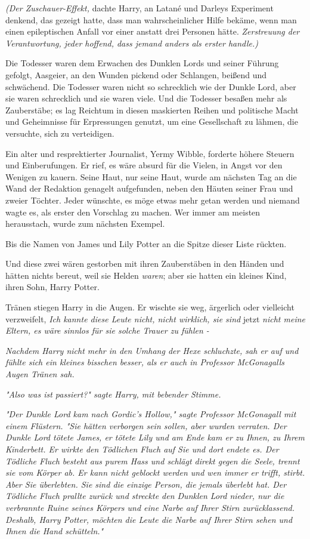 {\emph{(Der Zuschauer-Effekt,} dachte Harry, an Latané und Darleys Experiment denkend, das gezeigt hatte, dass man wahrscheinlicher Hilfe bekäme, wenn man einen epileptischen Anfall vor einer anstatt drei Personen hätte. \emph{Zerstreuung der Verantwortung, jeder hoffend, dass jemand anders als erster handle.)}

Die Todesser waren dem Erwachen des Dunklen Lords und seiner Führung gefolgt, Aasgeier, an den Wunden pickend oder Schlangen, beißend und schwächend. Die Todesser waren nicht so schrecklich wie der Dunkle Lord, aber sie waren schrecklich und sie waren viele. Und die Todesser besaßen mehr als Zauberstäbe; es lag Reichtum in diesen maskierten Reihen und politische Macht und Geheimnisse für Erpressungen genutzt, um eine Gesellschaft zu lähmen, die versuchte, sich zu verteidigen.

Ein alter und resprektierter Journalist, Yermy Wibble, forderte höhere Steuern und Einberufungen. Er rief, es wäre absurd für die Vielen, in Angst vor den Wenigen zu kauern. Seine Haut, nur seine Haut, wurde am nächsten Tag an die Wand der Redaktion genagelt aufgefunden, neben den Häuten seiner Frau und zweier Töchter. Jeder wünschte, es möge etwas mehr getan werden und niemand wagte es, als erster den Vorschlag zu machen. Wer immer am meisten herausstach, wurde zum nächsten Exempel.

Bis die Namen von James und Lily Potter an die Spitze dieser Liste rückten.

Und diese zwei wären gestorben mit ihren Zauberstäben in den Händen und hätten nichts bereut, weil sie Helden \emph{waren}; aber sie hatten ein kleines Kind, ihren Sohn, Harry Potter.

Tränen stiegen Harry in die Augen. Er wischte sie weg, ärgerlich oder vielleicht verzweifelt, \emph{Ich kannte diese Leute nicht, nicht wirklich, sie sind} jetzt \emph{nicht meine Eltern, es wäre sinnlos für sie solche Trauer zu fühlen -}

\emph{Nachdem Harry nicht mehr in den Umhang der Hexe schluchzte, sah er auf und fühlte sich ein kleines bisschen besser, als er auch in Professor McGonagalls Augen Tränen sah.}

\emph{"Also was ist passiert?" sagte Harry, mit bebender Stimme.}

\emph{"Der Dunkle Lord kam nach Gordic's Hollow," sagte Professor McGonagall mit einem Flüstern. "Sie hätten verborgen sein sollen, aber wurden verraten. Der Dunkle Lord tötete James, er tötete Lily und am Ende kam er zu Ihnen, zu Ihrem Kinderbett. Er wirkte den Tödlichen Fluch auf Sie und dort endete es. Der Tödliche Fluch besteht aus purem Hass und schlägt direkt gegen die Seele, trennt sie vom Körper ab. Er kann nicht geblockt werden und wen immer er trifft, stirbt. Aber Sie überlebten. Sie sind die einzige Person, die jemals überlebt hat. Der Tödliche Fluch prallte zurück und streckte den Dunklen Lord nieder, nur die verbrannte Ruine seines Körpers und eine Narbe auf Ihrer Stirn zurücklassend. Deshalb, Harry Potter, möchten die Leute die Narbe auf Ihrer Stirn sehen und Ihnen die Hand schütteln."}

}
